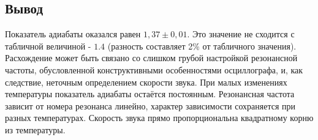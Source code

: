 	\subsection*{Вывод}\n
	Показатель адиабаты оказался равен $1,37 \pm 0,01$. Это значение не сходится с табличной величиной - $1.4$ (разность составляет 2\% от табличного значения). Расхождение может быть связано со слишком грубой настройкой резонансной частоты, обусловленной конструктивными особенностями осциллографа, и, как следствие, неточным определением скорости звука.\n\n
	При малых изменениях температуры показатель адиабаты остаётся постоянным.\n\n
	Резонансная частота зависит от номера резонанса линейно, характер зависимости сохраняется при разных температурах.\n\n
	Скорость звука прямо пропорциональна квадратному корню из температуры.

